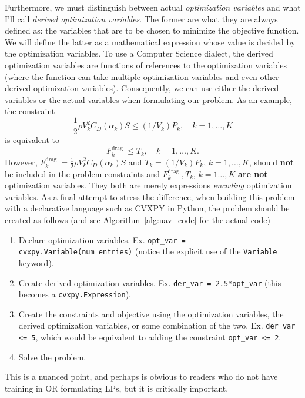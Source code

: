 \documentclass[12pt,reqno]{article}
\theoremstyle{definition}
\numberwithin{equation}{section}
\begin{document}
    Furthermore,
    we must distinguish between actual \textit{optimization variables} and what I'll call \textit{derived optimization variables}.
    The former are what they are always defined as: the variables that are to be chosen to minimize the objective function.
    We will define the latter as a mathematical expression whose value is decided by the optimization variables.
    To use a Computer Science dialect, the derived optimization variables are functions of references to the optimization variables
    (where the function can take multiple optimization variables and even other derived optimization variables).
    Consequently, we can use either the derived variables or the actual variables when formulating our problem.
    As an example, the constraint
    \[\frac{1}{2} \rho V_k^2 C_D\left(\alpha_k\right) S \le \left(1/V_k \right)P_k, \quad k = 1, \ldots, K\]
    is equivalent to
    \[F_k^{\text {drag }} \le T_k, \quad k=1, \ldots, K.\]
    However, $F_k^{\text {drag }} = \frac{1}{2} \rho V_k^2 C_D\left(\alpha_k\right) S$ and $T_k = \left(1/V_k \right)P_k$, $k = 1, \ldots, K$,
    should \textbf{not} be included in the problem constraints and $F_k^{\text {drag }}, T_k$, $k=1\ldots, K$ 
    \textbf{are not} optimization variables. They both are merely expressions \textit{encoding} optimization variables.
    As a final attempt to stress the difference, when building this problem with a declarative language such as CVXPY in Python,
    the problem should be created as follows (and see Algorithm~\ref{alg:uav_code} for the actual code)
    \begin{enumerate}
        \item Declare optimization variables. Ex. \lstinline|opt_var = cvxpy.Variable(num_entries)| (notice the explicit
        use of the \lstinline|Variable| keyword).
        \item Create derived optimization variables. Ex. \lstinline|der_var = 2.5*opt_var| (this becomes a \lstinline|cvxpy.Expression|).
        \item Create the constraints and objective using the optimization variables,
        the derived optimization variables, or some combination of the two. Ex. \lstinline|der_var <= 5|,
        which would be equivalent to adding the constraint \lstinline|opt_var <= 2|.
        \item Solve the problem.
    \end{enumerate}
    This is a nuanced point, and perhaps is obvious
    to readers who do not have training in OR formulating LPs, but it is critically important.
\end{document}
